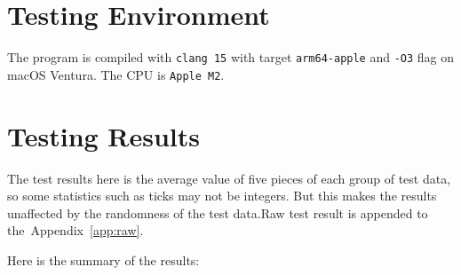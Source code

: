 \documentclass[a4paper,oneside]{book}
\begin{document}
\section{Testing Environment}

The program is compiled with \verb|clang 15| with target \verb|arm64-apple| and
\verb|-O3| flag on macOS Ventura. The CPU is \verb|Apple M2|. 

\section{Testing Results}

The test results here is the average value of five pieces of each group of test
data, so some statistics such as ticks may not be integers. But this makes the
results unaffected by the randomness of the test data.Raw test result is appended to the~Appendix~\ref{app:raw}. 

Here is the summary of the results:
\end{document}

